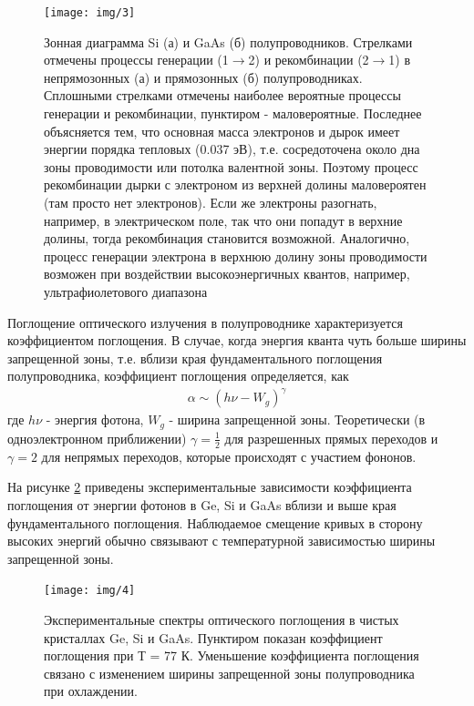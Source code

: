\begin{figure}[H]
	\centering
	\texttt{[image: img/3]}
	\caption{Зонная диаграмма Si (а) и GaAs (б) полупроводников. 
Стрелками отмечены процессы генерации (1$\to$2) и рекомбинации (2$\to$1) в непрямозонных (а) и прямозонных (б) полупроводниках.    Сплошными
стрелками отмечены наиболее вероятные процессы генерации и рекомбинации, пунктиром - маловероятные. Последнее объясняется тем, что основная масса электронов и дырок имеет энергии порядка тепловых (0.037 эВ), т.е. сосредоточена около дна зоны проводимости или потолка валентной зоны. Поэтому процесс рекомбинации дырки с электроном из верхней долины маловероятен (там просто нет электронов). Если же электроны разогнать, например, в электрическом поле, так что они попадут в верхние долины, тогда рекомбинация становится возможной. Аналогично, процесс генерации электрона в верхнюю долину зоны проводимости возможен при воздействии высокоэнергичных квантов, например, ультрафиолетового диапазона}
	\label{fig:figure2}
\end{figure}
% 

Поглощение оптического излучения в полупроводнике характеризуется коэффициентом поглощения. В случае, когда энергия кванта чуть больше ширины запрещенной зоны, т.е. вблизи края фундаментального поглощения полупроводника, коэффициент поглощения определяется, как 
\begin{gather}
	\label{eq3}
	\alpha \sim\left(h\nu-W_{g}\right)^{\gamma}
\end{gather}
где $h\nu$ - энергия фотона, $W_g$ - ширина запрещенной зоны. Теоретически (в одноэлектронном приближении) $\gamma=\frac12$ для разрешенных
прямых переходов и $\gamma=2$ для непрямых переходов, которые происходят с участием фононов.

На рисунке \ref{fig:figure3} приведены экспериментальные зависимости коэффициента поглощения от энергии фотонов в Ge, Si и GaAs вблизи и выше края фундаментального поглощения. Наблюдаемое смещение кривых в сторону высоких энергий обычно связывают с температурной зависимостью ширины запрещенной зоны.


\begin{figure}[H]
	\centering
	\texttt{[image: img/4]}
	\caption{Экспериментальные спектры оптического поглощения в чистых кристаллах Ge, Si и GaAs. Пунктиром показан коэффициент поглощения при Т = 77 К. Уменьшение коэффициента поглощения связано с изменением ширины запрещенной зоны полупроводника при охлаждении.}
	\label{fig:figure3}
\end{figure}


